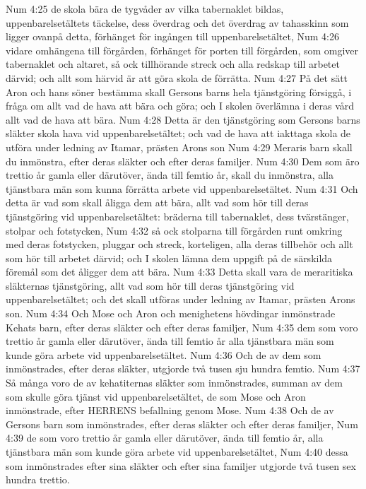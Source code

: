 Num 4:25  de skola bära de tygvåder av vilka tabernaklet bildas, uppenbarelsetältets täckelse, dess överdrag och det överdrag av tahasskinn som ligger ovanpå detta, förhänget för ingången till uppenbarelsetältet,
Num 4:26  vidare omhängena till förgården, förhänget för porten till förgården, som omgiver tabernaklet och altaret, så ock tillhörande streck och alla redskap till arbetet därvid; och allt som härvid är att göra skola de förrätta.
Num 4:27  På det sätt Aron och hans söner bestämma skall Gersons barns hela tjänstgöring försiggå, i fråga om allt vad de hava att bära och göra; och I skolen överlämna i deras vård allt vad de hava att bära.
Num 4:28  Detta är den tjänstgöring som Gersons barns släkter skola hava vid uppenbarelsetältet; och vad de hava att iakttaga skola de utföra under ledning av Itamar, prästen Arons son
Num 4:29  Meraris barn skall du inmönstra, efter deras släkter och efter deras familjer.
Num 4:30  Dem som äro trettio år gamla eller därutöver, ända till femtio år, skall du inmönstra, alla tjänstbara män som kunna förrätta arbete vid uppenbarelsetältet.
Num 4:31  Och detta är vad som skall åligga dem att bära, allt vad som hör till deras tjänstgöring vid uppenbarelsetältet: bräderna till tabernaklet, dess tvärstänger, stolpar och fotstycken,
Num 4:32  så ock stolparna till förgården runt omkring med deras fotstycken, pluggar och streck, korteligen, alla deras tillbehör och allt som hör till arbetet därvid; och I skolen lämna dem uppgift på de särskilda föremål som det åligger dem att bära.
Num 4:33  Detta skall vara de meraritiska släkternas tjänstgöring, allt vad som hör till deras tjänstgöring vid uppenbarelsetältet; och det skall utföras under ledning av Itamar, prästen Arons son.
Num 4:34  Och Mose och Aron och menighetens hövdingar inmönstrade Kehats barn, efter deras släkter och efter deras familjer,
Num 4:35  dem som voro trettio år gamla eller därutöver, ända till femtio år alla tjänstbara män som kunde göra arbete vid uppenbarelsetältet.
Num 4:36  Och de av dem som inmönstrades, efter deras släkter, utgjorde två tusen sju hundra femtio.
Num 4:37  Så många voro de av kehatiternas släkter som inmönstrades, summan av dem som skulle göra tjänst vid uppenbarelsetältet, de som Mose och Aron inmönstrade, efter HERRENS befallning genom Mose.
Num 4:38  Och de av Gersons barn som inmönstrades, efter deras släkter och efter deras familjer,
Num 4:39  de som voro trettio år gamla eller därutöver, ända till femtio år, alla tjänstbara män som kunde göra arbete vid uppenbarelsetältet,
Num 4:40  dessa som inmönstrades efter sina släkter och efter sina familjer utgjorde två tusen sex hundra trettio.
